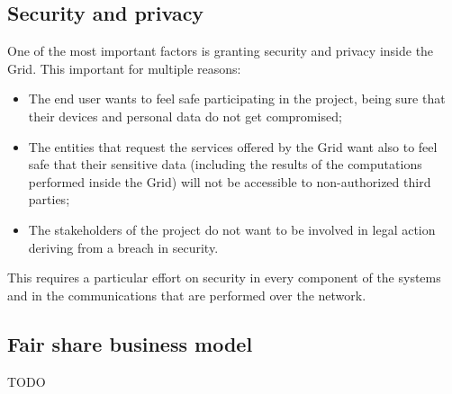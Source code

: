 \subsection{Security and privacy}
One of the most important factors is granting security and privacy inside the Grid. This important for multiple reasons:
\begin{itemize}
    \item The end user wants to feel safe participating in the project, being sure that their devices and personal data do not get compromised;
    \item The entities that request the services offered by the Grid want also to feel safe that their sensitive data (including the results of the computations performed inside the Grid) will not be accessible to non-authorized third parties;
    \item The stakeholders of the project do not want to be involved in legal action deriving from a breach in security.
\end{itemize}

This requires a particular effort on security in every component of the systems and in the communications that are performed over the network.

\subsection{Fair share business model}
TODO
